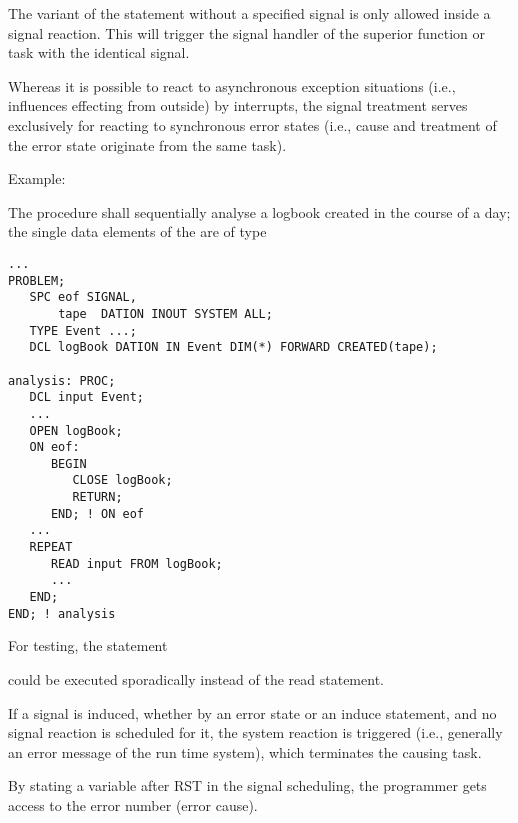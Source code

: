 The variant of the  statement without a specified signal is 
only allowed inside a signal reaction. This will trigger the signal handler
of the superior function or task with the identical signal.


Whereas it is possible to react to asynchronous exception situations
(i.e., influences effecting from outside) by interrupts, the signal
treatment serves exclusively for reacting to synchronous error states
(i.e., cause and treatment of the error state originate from the same
task).

Example:

The procedure  shall sequentially analyse a logbook created
in the course of a day; the single data elements of the  are of
type 

\begin{lstlisting}
...
PROBLEM;
   SPC eof SIGNAL,
       tape  DATION INOUT SYSTEM ALL;
   TYPE Event ...;
   DCL logBook DATION IN Event DIM(*) FORWARD CREATED(tape);

analysis: PROC;
   DCL input Event;
   ...
   OPEN logBook;
   ON eof:
      BEGIN
         CLOSE logBook;
         RETURN;
      END; ! ON eof
   ...
   REPEAT
      READ input FROM logBook;
      ...
   END;
END; ! analysis
\end{lstlisting}

For testing, the statement

 

could be executed sporadically instead of the read statement.



If a signal is induced, whether by an error state or an induce
statement, and no signal reaction is scheduled for it, the system
reaction is triggered (i.e., generally an error message of the run time
system), which terminates the causing task.

By stating a variable after RST in the signal scheduling, the programmer
gets access to the error number (error cause). 
%


